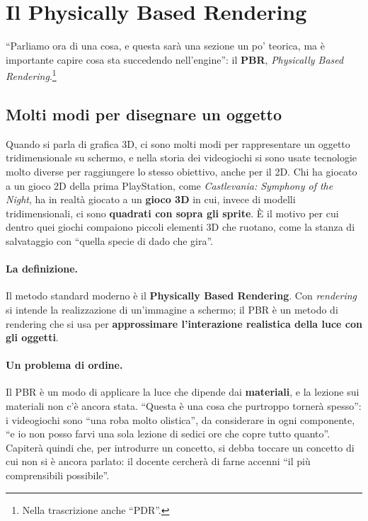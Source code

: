 \section{Il Physically Based Rendering}
\label{gd14:sec:pbr}



``Parliamo ora di una cosa, e questa sarà una sezione un po' teorica, ma è
importante capire cosa sta succedendo nell'engine'': il \textbf{PBR},
\emph{Physically Based Rendering}.\footnote{Nella trascrizione anche ``PDR''.}

\subsection{Molti modi per disegnare un oggetto}

Quando si parla di grafica 3D, ci sono molti modi per rappresentare un oggetto
tridimensionale su schermo, e nella storia dei videogiochi si sono usate tecnologie
molto diverse per raggiungere lo stesso obiettivo, anche per il 2D. Chi ha giocato
a un gioco 2D della prima PlayStation, come \emph{Castlevania: Symphony of the
Night}, ha in realtà giocato a un \textbf{gioco 3D} in cui, invece di modelli
tridimensionali, ci sono \textbf{quadrati con sopra gli sprite}. È il motivo per cui
dentro quei giochi compaiono piccoli elementi 3D che ruotano, come la stanza di
salvataggio con ``quella specie di dado che gira''.

\paragraph{La definizione.} Il metodo standard moderno è il \textbf{Physically Based
Rendering}. Con \emph{rendering} si intende la realizzazione di un'immagine a
schermo; il PBR è un metodo di rendering che si usa per \textbf{approssimare
l'interazione realistica della luce con gli oggetti}.

\paragraph{Un problema di ordine.} Il PBR è un modo di applicare la luce che
dipende dai \textbf{materiali}, e la lezione sui materiali non c'è ancora stata.
``Questa è una cosa che purtroppo tornerà spesso'': i videogiochi sono ``una roba
molto olistica'', da considerare in ogni componente, ``e io non posso farvi una
sola lezione di sedici ore che copre tutto quanto''. Capiterà quindi che, per
introdurre un concetto, si debba toccare un concetto di cui non si è ancora
parlato: il docente cercherà di farne accenni ``il più comprensibili possibile''.

